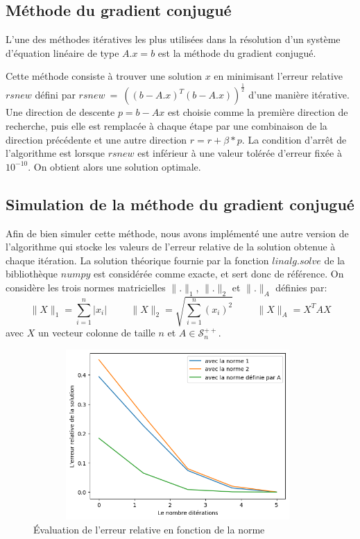\documentclass[a4paper]{article}
\begin{document}
\subsection{Méthode du gradient conjugué}

L'une des méthodes itératives les plus utilisées dans la résolution d'un système d'équation linéaire de type $A.x = b$ est la méthode du gradient conjugué.


Cette méthode consiste à trouver une solution $x$ en minimisant l'erreur relative 
$rsnew$ défini par $rsnew~=~((b-A.x)^{T}(b-A.x))^{\frac{1}{2}}$ d'une manière itérative. Une direction de descente $p=b-Ax$ est choisie comme la première direction de recherche, puis elle est remplacée à chaque étape par une combinaison de la direction précédente et une autre direction $r=r+\beta*p$. La condition d'arrêt de l'algorithme est lorsque $rsnew$ est inférieur à une valeur tolérée d'erreur fixée à $10^{-10}$. On obtient alors une solution optimale.


\subsection{Simulation de la méthode du gradient conjugué}

Afin de bien simuler cette méthode, nous avons implémenté une autre version de l'algorithme qui stocke les valeurs de l'erreur relative de la solution obtenue à chaque itération. La solution théorique fournie par la fonction $linalg.solve$ de la bibliothèque $numpy$ est considérée comme exacte, et sert donc de référence. On considère les trois normes matricielles $\| . \|_{1}$, $\| . \|_{2}$ et $\| . \|_{A}$ définies par:
\[ \| X \|_{1} = \sum_{i=1}^{n} |x_{i}| \hspace{1cm}  \| X \|_{2} = \sqrt{\sum_{i=1}^{n} (x_{i})^{2}} \hspace{1cm}  \| X \|_{A} =  X^{T}AX\]
avec $X$ un vecteur colonne de taille $n$ et $A \in \mathcal{S}_{n}^{++}$.

\begin{figure}[!h] 
  \includegraphics[width=11cm, height= 6.5cm]{normes.png}
  \centering
  \caption{Évaluation de l'erreur relative en fonction de la norme}
  \label{fig:norme}
\end{figure}
\end{document}
